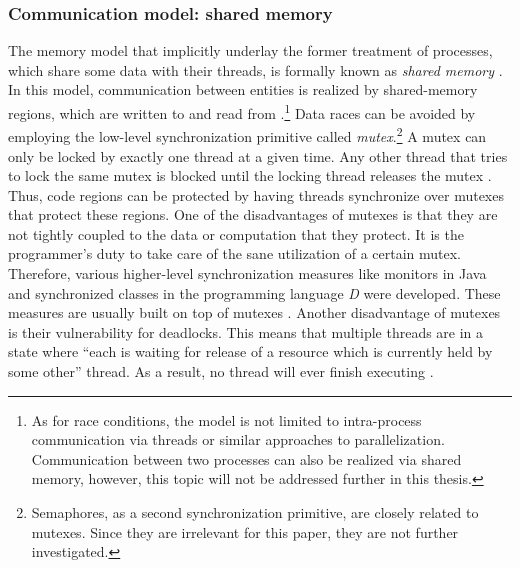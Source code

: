 \subsubsection{Communication model: shared memory}
The memory model that implicitly underlay the former treatment of processes, which share some data with their threads, is formally known as \textit{shared memory} . In this model, communication between entities is realized by shared-memory regions, which are written to and read from \cite[p.~138]{OperatingSystems_by_Haldar}.\footnote{As for race conditions, the model is not limited to intra-process communication via threads or similar approaches to parallelization. Communication between two processes can also be realized via shared memory, however, this topic will not be addressed further in this thesis.} Data races can be avoided by employing the low-level synchronization primitive called \textit{mutex}.\footnote{Semaphores, as a second synchronization primitive, are closely related to mutexes. Since they are irrelevant for this paper, they are not further investigated.} A mutex can only be locked by exactly one thread at a given time. Any other thread that tries to lock the same mutex is blocked until the locking thread releases the mutex \cite{AdvancedLinuxProgramming}. Thus, code regions can be protected by having threads synchronize over mutexes that protect these regions. One of the disadvantages of mutexes is that they are not tightly coupled to the data or computation that they protect. It is the programmer's duty to take care of the sane utilization of a certain mutex. Therefore, various higher-level synchronization measures like monitors in Java \cite[p.~42]{ConcurrentAndDistributedComputingInJava} and synchronized classes in the programming language \textit{D} \cite{TheDProgrammingLanguage} were developed. These measures are usually built on top of mutexes \cite[p.~25]{TamingJavaThreads}. Another disadvantage of mutexes is their vulnerability for deadlocks. This means that multiple threads are in a state where ``each is waiting for release of a resource which is currently held by some other'' \cite[p.~119]{IntroductionToOperatingSystems} thread. As a result, no thread will ever finish executing \cite[p.~2-3]{OperatingSystems_by_Dhotre}.

